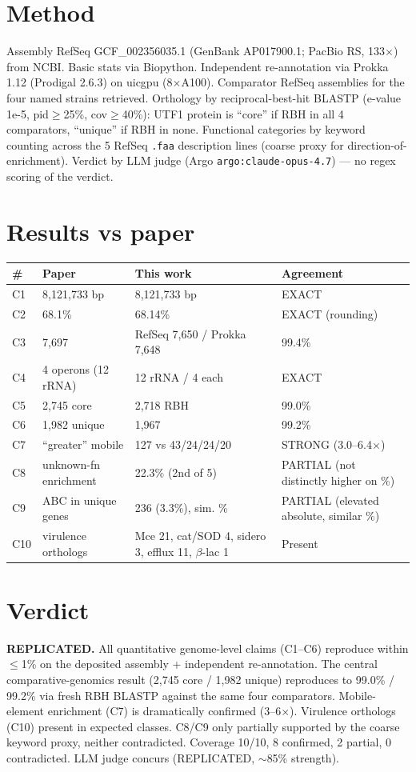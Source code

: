 \documentclass[11pt]{article}
\begin{document}
\section{Method}
Assembly RefSeq GCF\_002356035.1 (GenBank AP017900.1; PacBio RS, 133$\times$) from NCBI.
Basic stats via Biopython. Independent re-annotation via Prokka 1.12 (Prodigal 2.6.3) on
uicgpu (8$\times$A100). Comparator RefSeq assemblies for the four named strains retrieved.
Orthology by reciprocal-best-hit BLASTP (e-value 1e-5, pid$\geq$25\%, cov$\geq$40\%): UTF1
protein is ``core'' if RBH in all 4 comparators, ``unique'' if RBH in none. Functional
categories by keyword counting across the 5 RefSeq \texttt{.faa} description lines (coarse
proxy for direction-of-enrichment). Verdict by LLM judge (Argo \texttt{argo:claude-opus-4.7})
--- no regex scoring of the verdict.

\section{Results vs paper}
\begin{longtable}{llll}
\toprule
\# & Paper & This work & Agreement \\
\midrule
C1 & 8{,}121{,}733 bp & 8{,}121{,}733 bp & EXACT \\
C2 & 68.1\% & 68.14\% & EXACT (rounding) \\
C3 & 7{,}697 & RefSeq 7{,}650 / Prokka 7{,}648 & 99.4\% \\
C4 & 4 operons (12 rRNA) & 12 rRNA / 4 each & EXACT \\
C5 & 2{,}745 core & 2{,}718 RBH & 99.0\% \\
C6 & 1{,}982 unique & 1{,}967 & 99.2\% \\
C7 & ``greater'' mobile & 127 vs 43/24/24/20 & STRONG (3.0--6.4$\times$) \\
C8 & unknown-fn enrichment & 22.3\% (2nd of 5) & PARTIAL (not distinctly higher on \%) \\
C9 & ABC in unique genes & 236 (3.3\%), sim. \% & PARTIAL (elevated absolute, similar \%) \\
C10 & virulence orthologs & Mce 21, cat/SOD 4, sidero 3, efflux 11, $\beta$-lac 1 & Present \\
\bottomrule
\end{longtable}

\section{Verdict}
\textbf{REPLICATED.} All quantitative genome-level claims (C1--C6) reproduce within $\leq$1\%
on the deposited assembly + independent re-annotation. The central comparative-genomics result
(2{,}745 core / 1{,}982 unique) reproduces to 99.0\% / 99.2\% via fresh RBH BLASTP against the
same four comparators. Mobile-element enrichment (C7) is dramatically confirmed (3--6$\times$).
Virulence orthologs (C10) present in expected classes. C8/C9 only partially supported by the
coarse keyword proxy, neither contradicted. Coverage 10/10, 8 confirmed, 2 partial, 0
contradicted. LLM judge concurs (REPLICATED, $\sim$85\% strength).
\end{document}
